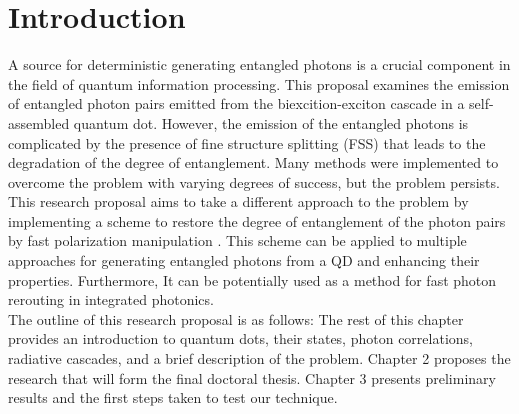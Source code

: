 \section{Introduction}
%
A source for deterministic generating entangled photons is a crucial component in the field of quantum information processing. This proposal examines the emission of entangled photon pairs emitted from the biexcition-exciton cascade in a self-assembled quantum dot.  However, the emission of the entangled photons is complicated by the presence of fine structure splitting (FSS)\cite{Winik2017} that leads to the degradation of the degree of entanglement. Many methods were implemented to overcome the problem with varying degrees of success, but the problem persists.\\ 
%
This research proposal aims to take a different approach to the problem by implementing a scheme to restore the degree of entanglement of the photon pairs by fast polarization manipulation \cite{Fognini18,Varo2022}. This scheme can be applied to multiple approaches for generating entangled photons from a QD and enhancing their properties. Furthermore, It can be potentially used as a method for fast photon rerouting in integrated photonics.\\
%
The outline of this research proposal is as follows: The rest of this chapter provides an introduction to quantum dots, their states,
photon correlations, radiative cascades, and a brief description of the problem. Chapter 2 proposes the research that will form the final doctoral thesis. Chapter 3 presents preliminary results and the first steps taken to test our technique.

